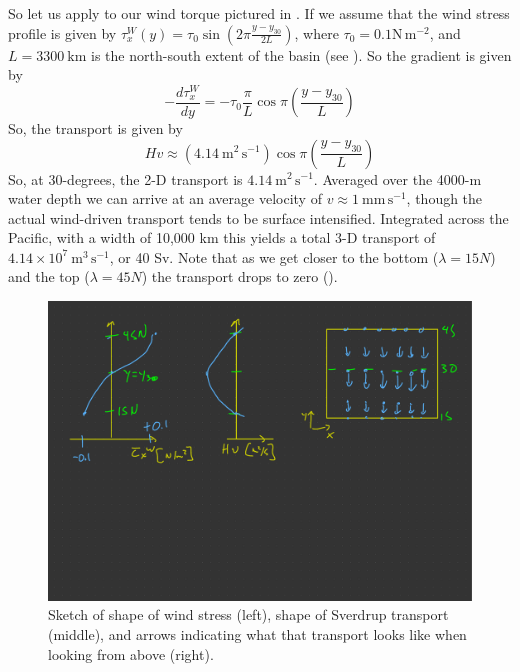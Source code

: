 So let us apply to our wind torque pictured in .  If we assume that the wind stress profile is given by $\tau_x^W(y) = \tau_0 \sin \left(2\pi \frac{y-y_{30}}{2L}\right)$, where $\tau_0 = 0.1 \mathrm{N\,m^{-2}}$, and $L = 3300\ \mathrm{km}$ is the north-south extent of the basin (see ).  So the gradient is given by 
\begin{equation}
    -\frac{d\tau_x^W}{dy} = -\tau_0 \frac{\pi}{L} \cos \pi  \left(\frac{y-y_{30}}{L}\right)
\end{equation}
So, the transport is given by 
\begin{equation}
    Hv \approx \left(4.14 \ \mathrm{m^2\,s^{-1}}\right) \cos \pi  \left(\frac{y-y_{30}}{L}\right)
\end{equation}
So, at 30-degrees, the 2-D transport is $4.14\ \mathrm{m^2\,s^{-1}}$. Averaged over the 4000-m water depth we can arrive at an average velocity of $v\approx 1\ \mathrm{mm\, s^{-1}}$, though the actual wind-driven transport tends to be surface intensified.  Integrated across the Pacific, with a width of 10,000 km this yields a total 3-D transport of $4.14\times10^{7}\ \mathrm{m^3\,s^{-1}}$, or 40 Sv.  Note that as we get closer to the bottom ($\lambda=15 N$) and the top ($\lambda= 45N$) the transport drops to zero (). 
\begin{figure}[hbt]
  \begin{center}
    \includegraphics{figs/Sverdrup/GyreWindSketch}
    \caption{Sketch of shape of wind stress (left), shape of Sverdrup transport (middle), and arrows indicating what that transport looks like when looking from above (right).}
    \label{fig:GyreWindSketch}  
  \end{center}
\end{figure}

